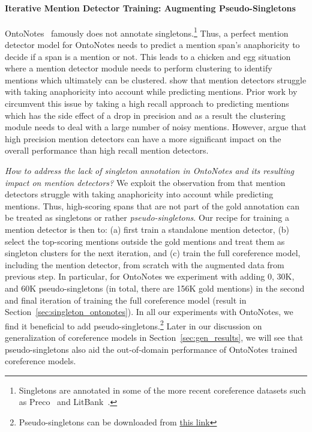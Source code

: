 \documentclass[12pt]{thesis-umich}[thesis]
\begin{document}
\paragraph{Iterative Mention Detector Training: Augmenting Pseudo-Singletons}
OntoNotes~\cite{weischedel2013ontonotes} famously does not annotate singletons.\footnote{Singletons are annotated in some of the more recent coreference datasets such as   Preco~\cite{chen-etal-2018-preco} and LitBank~\cite{bamman2019annotated}.
}  Thus, a perfect mention detector model for OntoNotes   
needs to predict a mention span's anaphoricity to decide if a span is a mention or not. 
This leads to a chicken and egg situation where a mention detector module needs to perform clustering to identify mentions which ultimately can be clustered.
\citet{wu2020understanding} show that mention detectors struggle with taking anaphoricity into account while predicting mentions. Prior work by \cite{lee-etal-2017-end, lee-etal-2018-higher, joshi-etal-2019-bert} circumvent this issue by taking a high recall approach to predicting mentions which has the side effect of a drop in precision and as a result the clustering module needs to deal with a large number of noisy mentions. However, \citet{wu2020understanding} argue that high precision mention detectors can have a more significant impact on the overall performance than high recall mention detectors. 

\emph{How to address the lack of singleton annotation in OntoNotes and its resulting impact on mention detectors?}
We exploit the observation from \citet{wu2020understanding} that  mention detectors struggle with taking anaphoricity into account while predicting mentions.
Thus, high-scoring spans that are not part of the gold annotation can be treated as singletons or rather \textit{pseudo-singletons}.  
Our recipe for training a mention detector is then to: (a) first train a standalone mention detector, (b) select the top-scoring mentions outside the gold mentions and treat them as singleton clusters for the next iteration, and (c) train the full coreference model, including the mention detector, from scratch with the augmented data from previous step.   
In particular, for OntoNotes we experiment with adding 0, 30K, and 60K 
pseudo-singletons (in total, there are 156K gold mentions) in the second and final iteration of training the full coreference model (result in Section~\ref{sec:singleton_ontonotes}). In all our experiments with OntoNotes, we find it beneficial to add pseudo-singletons.\footnote{Pseudo-singletons can be downloaded from \href{https://drive.google.com/drive/folders/1OdkX4xdhaKlkDM97U4rMNIxtzGi_BnNB?usp=sharing}{this link}} Later in our discussion on generalization of coreference models in Section~\ref{sec:gen_results}, we will see that pseudo-singletons also aid the out-of-domain performance of OntoNotes trained coreference models.   
\end{document}
